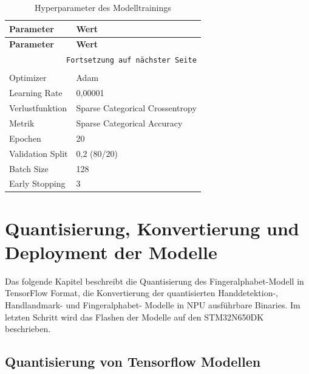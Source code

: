 \begin{longtable}{|p{}|p{}|}
    \hline
    \textbf{Parameter} & \textbf{Wert} \\
    \hline
    \endfirsthead
    \hline
    \textbf{Parameter} & \textbf{Wert} \\
    \hline
    \endhead
    \hline
    \multicolumn{2}{r}{\texttt{Fortsetzung auf nächster Seite}} \\
    \endfoot
    \caption{Hyperparameter des Modelltrainings}
    \label{tab:hyperparameter} \\
    \endlastfoot
    Optimizer & Adam \\
    \hline
    Learning Rate & 0,00001 \\
    \hline
    Verlustfunktion & Sparse Categorical Crossentropy \\
    \hline
    Metrik & Sparse Categorical Accuracy \\
    \hline
    Epochen & 20 \\
    \hline
    Validation Split & 0,2 (80/20) \\
    \hline
    Batch Size & 128 \\
    \hline
    Early Stopping & 3 \\
    \hline
\end{longtable}

\section{Quantisierung, Konvertierung und Deployment der Modelle}\label{sec:quantisierung-deployment}

Das folgende Kapitel beschreibt die Quantisierung des Fingeralphabet-Modell in TensorFlow Format, die Konvertierung der quantisierten Handdetektion-, Handlandmark- und Fingeralphabet- Modelle in NPU ausführbare Binaries. Im letzten Schritt wird das Flashen der Modelle auf den STM32N650DK beschrieben.

\newpage
\subsection{Quantisierung von Tensorflow Modellen}\label{sub:quantisierung-tf}

